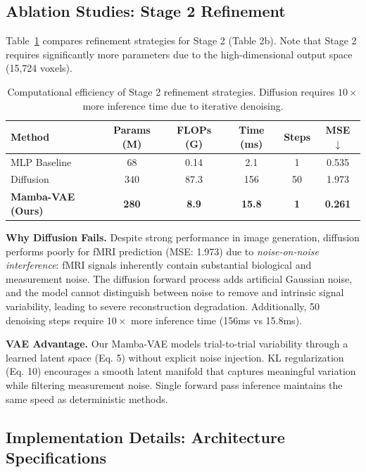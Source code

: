 \subsection{Ablation Studies: Stage 2 Refinement}
\label{sec:supp_stage2}

Table~\ref{tab:supp_stage2_efficiency} compares refinement strategies for Stage 2 (Table 2b).
Note that Stage 2 requires significantly more parameters due to the high-dimensional
output space (15,724 voxels).

\begin{table}[h]
\centering
\caption{Computational efficiency of Stage 2 refinement strategies.
Diffusion requires $10\times$ more inference time due to iterative denoising.}
\label{tab:supp_stage2_efficiency}
\begin{tabular}{lccccc}
\toprule
\textbf{Method} & \textbf{Params (M)} & \textbf{FLOPs (G)} & \textbf{Time (ms)} & \textbf{Steps} & \textbf{MSE} $\downarrow$ \\
\midrule
MLP Baseline & 68 & 0.14 & 2.1 & 1 & 0.535 \\
Diffusion & 340 & 87.3 & 156 & 50 & 1.973 \\
\midrule
\textbf{Mamba-VAE (Ours)} & \textbf{280} & \textbf{8.9} & \textbf{15.8} & \textbf{1} & \textbf{0.261} \\
\bottomrule
\end{tabular}
\end{table}

\textbf{Why Diffusion Fails.}
Despite strong performance in image generation, diffusion performs poorly for fMRI prediction
(MSE: 1.973) due to \textit{noise-on-noise interference}:
fMRI signals inherently contain substantial biological and measurement noise.
The diffusion forward process adds artificial Gaussian noise, and the model cannot
distinguish between noise to remove and intrinsic signal variability,
leading to severe reconstruction degradation.
Additionally, 50 denoising steps require $10\times$ more inference time (156ms vs 15.8ms).

\textbf{VAE Advantage.}
Our Mamba-VAE models trial-to-trial variability through a learned latent space (Eq. 5)
without explicit noise injection. KL regularization (Eq. 10) encourages a smooth latent
manifold that captures meaningful variation while filtering measurement noise.
Single forward pass inference maintains the same speed as deterministic methods.


\subsection{Implementation Details: Architecture Specifications}
\label{sec:supp_arch}

